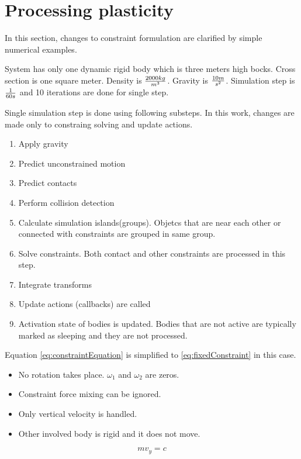 \section{Processing plasticity}

In this section, changes to constraint formulation are clarified by simple numerical examples.

System has only one dynamic rigid body which is three meters high bocks. Cross section is one square meter.
Density is $2000 kg \over m^3$. Gravity is $10 m\over s^2$. Simulation step is $1\over 60 s$ and 10 
iterations are done for single step.

Single simulation step is done using following substeps. 
In this work, changes are made only to constraing solving and update actions.
\begin{enumerate}
\item Apply gravity
\item Predict unconstrained motion
\item Predict contacts
\item Perform collision detection
\item Calculate simulation islands(groups). Objetcs that are near each other or connected with constraints are grouped in same group.
\item Solve constraints. Both contact and other constraints are processed in this step.
\item Integrate transforms
\item Update actions (callbacks) are called
\item Activation state of bodies is updated. Bodies that are not active
 are typically marked as sleeping and they are not processed.
\end{enumerate} 

Equation \ref{eq:constraintEquation} is simplified
to \ref{eq:fixedConstraint} in this case.
\begin{itemize}
\item No rotation takes place. $\omega_1$ and $\omega_2$ are zeros.
\item Constraint force mixing can be ignored.
\item Only vertical velocity is handled.
\item Other involved body is rigid and it does not move.
\end{itemize} 

\begin{equation} \label{eq:fixedConstraint}
m v_y = c 
\end{equation}

